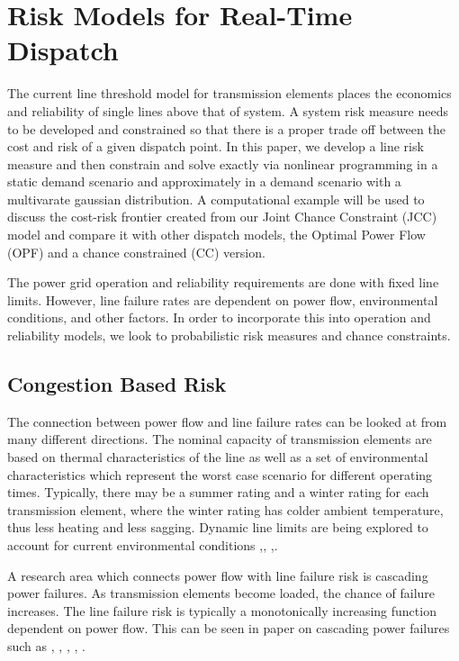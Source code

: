 \newcommand{\mypathjcc}{../thesis/jcc}
\newcommand{\mypathjccdata}{../thesis/jcc/data}

\chapter{Risk Models for Real-Time Dispatch}
The current line threshold model for transmission elements places the economics and reliability of single lines above that of system.  A system risk measure needs to be developed and constrained so that there is a proper trade off between the cost and risk of a given dispatch point.  In this paper, we develop a line risk measure and then constrain and solve exactly via nonlinear programming in a static demand scenario and approximately in a demand scenario with a multivarate gaussian distribution.  A computational example will be used to discuss the cost-risk frontier created from our Joint Chance Constraint (JCC) model and compare it with other dispatch models, the Optimal Power Flow (OPF) and a chance constrained (CC) version.  

The power grid operation and reliability requirements are done with fixed line limits.  However, line failure rates are dependent on power flow, environmental conditions, and other factors.  In order to incorporate this into operation and reliability models, we look to probabilistic risk measures and chance constraints. 


\section{Congestion Based Risk}
The connection between power flow and line failure rates can be looked at from many different directions.  The nominal capacity of transmission elements are based on thermal characteristics of the line as well as a set of environmental characteristics which represent the worst case scenario for different operating times.  Typically, there may be a summer rating and a winter rating for each transmission element, where the winter rating has colder ambient temperature, thus less heating and less sagging.  Dynamic line limits are being explored to account for current environmental conditions \cite{bucher_2013},\cite{yip_2009}, \cite{wang_2011},\cite{zhang_2002}.

A research area which connects power flow with line failure risk is cascading power failures.  As transmission elements become loaded, the chance of failure increases. The line failure risk is typically a monotonically increasing function dependent on power flow.  This can be seen in paper on cascading power failures such as \cite{carreras_2002}, \cite{chen_2005}, \cite{dobson_2007}, \cite{newman_2011}, \cite{hines_2011}.

